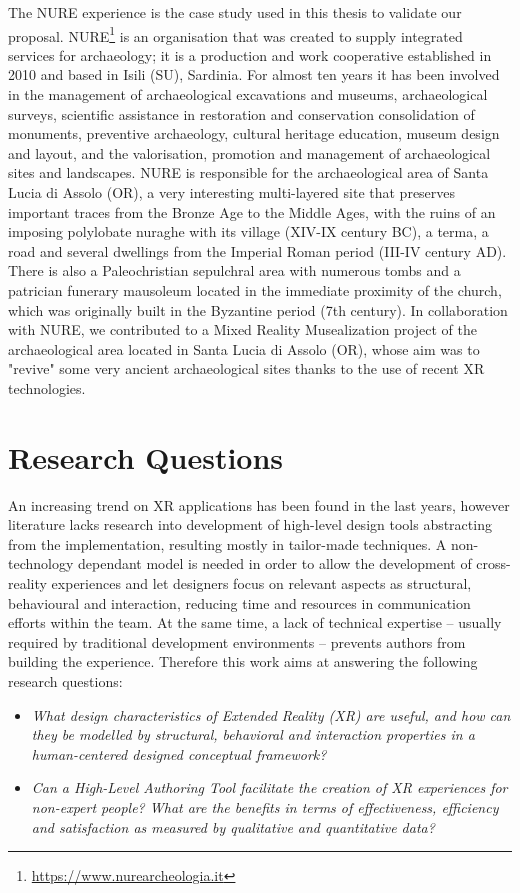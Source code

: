 The NURE experience is the case study used in this thesis to validate our proposal. 
NURE\footnote{\url{https://www.nurearcheologia.it}} is an organisation that was created to supply integrated services for archaeology; it is a production and work cooperative established in 2010 and based in Isili (SU), Sardinia. For almost ten years it has been involved in the management of archaeological excavations and museums, archaeological surveys, scientific assistance in restoration and conservation consolidation of monuments, preventive archaeology, cultural heritage education, museum design and layout, and the valorisation, promotion and management of archaeological sites and landscapes. 
NURE is responsible for the archaeological area of Santa Lucia di Assolo (OR), a very interesting multi-layered site that preserves important traces from the Bronze Age to the Middle Ages, with the ruins of an imposing polylobate nuraghe with its village (XIV-IX century BC), a terma, a road and several dwellings from the Imperial Roman period (III-IV century AD). There is also a Paleochristian sepulchral area with numerous tombs and a patrician funerary mausoleum located in the immediate proximity of the church, which was originally built in the Byzantine period (7th century).
In collaboration with NURE, we contributed to a Mixed Reality Musealization project of the archaeological area located in Santa Lucia di Assolo (OR), whose aim was to "revive" some very ancient archaeological sites thanks to the use of recent XR technologies.


\section{Research Questions}
An increasing trend on XR applications has been found in the last years, however literature lacks research into development of high-level design tools abstracting from the implementation, resulting mostly in tailor-made techniques. A non-technology dependant model is needed in order to allow the development of cross-reality experiences and let designers focus on relevant aspects as structural, behavioural and interaction, reducing time and resources in communication efforts within the team. At the same time, a lack of technical expertise -- usually required by traditional development environments -- prevents authors from building the experience. Therefore this work aims at answering the following research questions:
\begin{itemize}
    \item[RQ.1]\emph{What design characteristics of Extended Reality (XR) are useful, and how can they be modelled by structural, behavioral and interaction properties in a human-centered designed conceptual framework?}

    \item[RQ.2]\emph{Can a High-Level Authoring Tool facilitate the creation of XR experiences for non-expert people? What are the benefits in terms of effectiveness, efficiency and satisfaction as measured by qualitative and quantitative data?}
\end{itemize}

